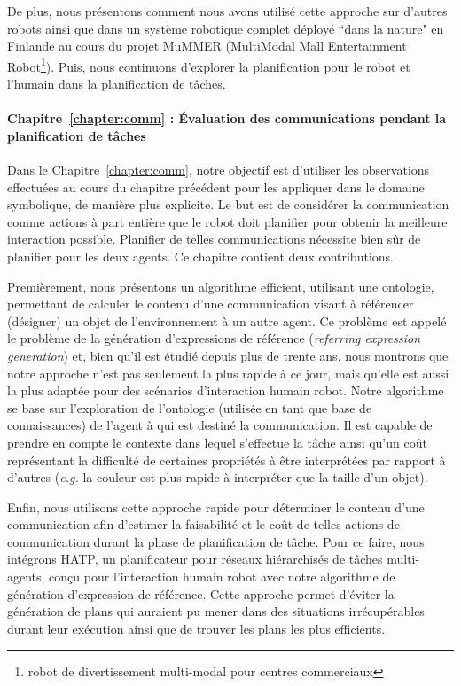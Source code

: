 De plus, nous présentons comment nous avons utilisé cette approche sur d'autres robots ainsi que dans un système robotique complet déployé ``dans la nature" en Finlande au cours du projet MuMMER (MultiModal Mall Entertainment Robot\footnote{robot de divertissement multi-modal pour centres commerciaux}). Puis, nous continuons d'explorer la planification pour le robot et l'humain dans la planification de tâches.


\paragraph{Chapitre~\ref{chapter:comm} : Évaluation des communications pendant la planification de tâches}
Dans le Chapitre~\ref{chapter:comm}, notre objectif est d'utiliser les observations effectuées au cours du chapitre précédent pour les appliquer dans le domaine symbolique, de manière plus explicite. Le but est de considérer la communication comme actions à part entière que le robot doit planifier pour obtenir la meilleure interaction possible. Planifier de telles communications nécessite bien sûr de planifier pour les deux agents. Ce chapitre contient deux contributions. 

Premièrement, nous présentons un algorithme efficient, utilisant une ontologie, permettant de calculer le contenu d'une communication visant à référencer (désigner) un objet de l’environnement à un autre agent. Ce problème est appelé le problème de la génération d'expressions de référence (\textit{referring expression generation}) et, bien qu'il est étudié depuis plus de trente ans, nous montrons que notre approche n'est pas seulement la plus rapide à ce jour, mais qu'elle est aussi la plus adaptée pour des scénarios d'interaction humain robot. Notre algorithme se base sur l'exploration de l'ontologie (utilisée en tant que base de connaissances) de l'agent à qui est destiné la communication. Il est capable de prendre en compte le contexte dans lequel s'effectue la tâche ainsi qu'un coût représentant la difficulté de certaines propriétés à être interprétées par rapport à d'autres (\textit{e.g.} la couleur est plus rapide à interpréter que la taille d'un objet).

Enfin, nous utilisons cette approche rapide pour déterminer le contenu d'une communication afin d'estimer la faisabilité et le coût de telles actions de communication durant la phase de planification de tâche. Pour ce faire, nous intégrons HATP, un planificateur pour réseaux hiérarchisés de tâches multi-agents, conçu pour l'interaction humain robot avec notre algorithme de génération d'expression de référence. Cette approche permet d'éviter la génération de plans qui auraient pu mener dans des situations irrécupérables durant leur exécution ainsi que de trouver les plans les plus efficients.

